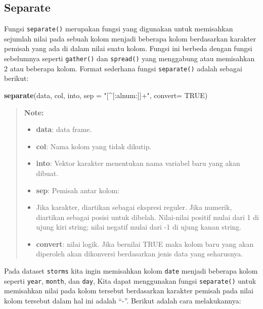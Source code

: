 \documentclass[]{book}
\newenvironment{Shaded}{\begin{snugshade}}{\end{snugshade}}
\newcommand{\KeywordTok}[1]{\textcolor[rgb]{0.13,0.29,0.53}{\textbf{#1}}}
\newcommand{\DataTypeTok}[1]{\textcolor[rgb]{0.13,0.29,0.53}{#1}}
\newcommand{\StringTok}[1]{\textcolor[rgb]{0.31,0.60,0.02}{#1}}
\newcommand{\OtherTok}[1]{\textcolor[rgb]{0.56,0.35,0.01}{#1}}
\newcommand{\NormalTok}[1]{#1}
\providecommand{\tightlist}{%
  \setlength{\itemsep}{0pt}\setlength{\parskip}{0pt}}
\begin{document}
\subsection{Separate}\label{separate}

Fungsi \texttt{separate()} merupakan fungsi yang digunakan untuk
memisahkan sejumlah nilai pada sebuah kolom menjadi beberapa kolom
berdasarkan karakter pemisah yang ada di dalam nilai suatu kolom. Fungsi
ini berbeda dengan fungsi sebelumnya seperti \texttt{gather()} dan
\texttt{spread()} yang menggabung atau memisahkan 2 atau beberapa kolom.
Format sederhana fungsi \texttt{separate()} adalah sebagai berikut:

\begin{Shaded}
\begin{Highlighting}[]
\KeywordTok{separate}\NormalTok{(data, col, into, }\DataTypeTok{sep =} \StringTok{"[^[:alnum:]]+"}\NormalTok{, }\DataTypeTok{convert=} \OtherTok{TRUE}\NormalTok{)}
\end{Highlighting}
\end{Shaded}

\begin{quote}
\textbf{Note: }

\begin{itemize}
\tightlist
\item
  \textbf{data}: data frame.
\item
  \textbf{col}: Nama kolom yang tidak dikutip.
\item
  \textbf{into}: Vektor karakter menentukan nama variabel baru yang akan
  dibuat.
\item
  \textbf{sep}: Pemisah antar kolom:
\item
  Jika karakter, diartikan sebagai ekspresi reguler. Jika numerik,
  diartikan sebagai posisi untuk dibelah. Nilai-nilai positif mulai dari
  1 di ujung kiri string; nilai negatif mulai dari -1 di ujung kanan
  string.
\item
  \textbf{convert}: nilai logik. Jika bernilai TRUE maka kolom baru yang
  akan diperoleh akan dikonversi berdasarkan jenis data yang seharusnya.
\end{itemize}
\end{quote}

Pada dataset \texttt{storms} kita ingin memisahkan kolom \texttt{date}
menjadi beberapa kolom seperti \texttt{year}, \texttt{month}, dan
\texttt{day}, Kita dapat menggunakan fungsi \texttt{separate()} untuk
memisahkan nilai pada kolom tersebut berdasarkan karakter pemisah pada
nilai kolom tersebut dalam hal ini adalah ``-''. Berikut adalah cara
melakukannya:
\end{document}
